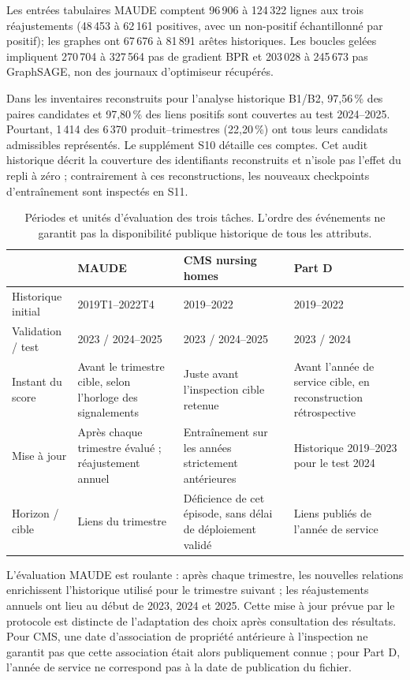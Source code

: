 Les entrées tabulaires MAUDE comptent 96\,906 à 124\,322 lignes aux trois réajustements (48\,453 à 62\,161 positives, avec un non-positif échantillonné par positif); les graphes ont 67\,676 à 81\,891 arêtes historiques. Les boucles gelées impliquent 270\,704 à 327\,564 pas de gradient BPR et 203\,028 à 245\,673 pas GraphSAGE, non des journaux d'optimiseur récupérés.

Dans les inventaires reconstruits pour l'analyse historique B1/B2, 97,56\,\% des paires candidates et 97,80\,\% des liens positifs sont couvertes au test 2024--2025. Pourtant, 1\,414 des 6\,370 produit--trimestres (22,20\,\%) ont tous leurs candidats admissibles représentés. Le supplément S10 détaille ces comptes. Cet audit historique décrit la couverture des identifiants reconstruits et n'isole pas l'effet du repli à zéro ; contrairement à ces reconstructions, les nouveaux checkpoints d'entraînement sont inspectés en S11.

\begin{table}[!htbp]
\centering\footnotesize
\caption{Périodes et unités d'évaluation des trois tâches. L'ordre des événements ne garantit pas la disponibilité publique historique de tous les attributs.}
\label{tab:time}
\begin{tabularx}{\linewidth}{@{}lXXX@{}}
\toprule
 & MAUDE & CMS nursing homes & Part D\\
\midrule
Historique initial & 2019T1--2022T4 & 2019--2022 & 2019--2022\\
Validation / test & 2023 / 2024--2025 & 2023 / 2024--2025 & 2023 / 2024\\
Instant du score & Avant le trimestre cible, selon l'horloge des signalements & Juste avant l'inspection cible retenue & Avant l'année de service cible, en reconstruction rétrospective\\
Mise à jour & Après chaque trimestre évalué ; réajustement annuel & Entraînement sur les années strictement antérieures & Historique 2019--2023 pour le test 2024\\
Horizon / cible & Liens du trimestre & Déficience de cet épisode, sans délai de déploiement validé & Liens publiés de l'année de service\\
\bottomrule
\end{tabularx}
\end{table}

L'évaluation MAUDE est roulante : après chaque trimestre, les nouvelles relations enrichissent l'historique utilisé pour le trimestre suivant ; les réajustements annuels ont lieu au début de 2023, 2024 et 2025. Cette mise à jour prévue par le protocole est distincte de l'adaptation des choix après consultation des résultats. Pour CMS, une date d'association de propriété antérieure à l'inspection ne garantit pas que cette association était alors publiquement connue ; pour Part D, l'année de service ne correspond pas à la date de publication du fichier\cite{hgbcode,hgbresults}.

